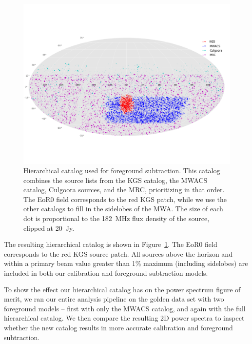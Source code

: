 \documentclass[iop]{emulateapj}
\begin{document}
\begin{figure}
\begin{center}
\includegraphics[width=\textwidth]{master_catalog.pdf}
\caption{
Hierarchical catalog used for foreground subtraction. This catalog combines the source lists 
from the KGS catalog, the MWACS catalog, Culgoora sources, and the MRC, 
prioritizing in that order. The EoR0 field corresponds to the red KGS patch, while we use the 
other catalogs to fill in the sidelobes of the MWA. The size of each dot is proportional to the 
182~MHz flux density of the source, clipped at 20~Jy.
\label{fig:master_catalog}
}
\end{center}
\end{figure}

The resulting hierarchical catalog is shown in Figure~\ref{fig:master_catalog}. The EoR0 
field corresponds to the red KGS source patch. All sources above the horizon and within a 
primary beam value greater than 1\% maximum (including sidelobes) are included in both 
our calibration and foreground subtraction models.  

To show the effect our hierarchical catalog has on the power spectrum figure of merit, we 
ran our entire analysis pipeline on the golden data set with two foreground models -- first 
with only the MWACS catalog, and again with the full hierarchical catalog. We then 
compare the resulting 2D power spectra to inspect whether the new catalog results in more 
accurate calibration and foreground subtraction.
\end{document}
